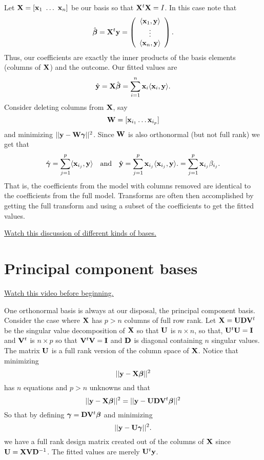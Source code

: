 Let $\mathbf{X} = [\mathbf{x}_1 ~ \ldots ~ \mathbf{x}_n]$ be our basis so that 
$\mathbf{X}^t \mathbf{X} = I$. In this case note that 
$$
\hat {\boldsymbol{\beta}}
= \mathbf{X}^t \mathbf{y} 
= 
\left(
\begin{array}{c}
 \langle \mathbf{x}_1, \mathbf{y} \rangle \\
 \vdots \\
 \langle \mathbf{x}_n, \mathbf{y} \rangle
\end{array}
\right).
$$
Thus, our coefficients are exactly the inner products of the basis elements (columns of $\mathbf{X}$) and the outcome. Our fitted values are
$$
\hat {\mathbf{y}} = \mathbf{X} \hat {\boldsymbol{\beta}} = \sum_{i=1}^n \mathbf{x}_i \langle \mathbf{x}_i, \mathbf{y} \rangle.
$$
Consider deleting columns from $\mathbf{X}$, say 
$$
\mathbf{W} = [\mathbf{x}_{i_1} \ldots \mathbf{x}_{i_p}]
$$
and minimizing $||\mathbf{y} - \mathbf{W} \boldsymbol{\gamma}||^2$. Since $\mathbf{W}$ is also orthonormal (but not full rank) we get that 
$$
\hat {\boldsymbol{\gamma}} = \sum_{j=1}^p \langle \mathbf{x}_{i_j}, \mathbf{y} \rangle ~~~
\mbox{and} ~~~
\hat {\mathbf{y}} = \sum_{j=1}^p \mathbf{x}_{i_j} \langle \mathbf{x}_{i_j}, \mathbf{y} \rangle.
=  \sum_{j=1}^p \mathbf{x}_{i_j} \beta_{i_j}.
$$
That is, the coefficients from the model with columns removed are identical
to the coefficients from the full model. Transforms are often then
accomplished by getting the full transform and using a subset of the 
coefficients to get the fitted values. 

\href{https://www.youtube.com/watch?v=E-GvgGkYSoQ&list=PLpl-gQkQivXhdgUCdaUQcdb31CRe8Mm2y&index=33}{Watch this discussion of different kinds of bases.}


\section{Principal component bases}

\href{https://www.youtube.com/watch?v=mVrm4CxQ1Xs&list=PLpl-gQkQivXhdgUCdaUQcdb31CRe8Mm2y&index=34}{Watch this video before beginning.}

One orthonormal basis is always at our disposal, the principal component basis. 
Consider the case where $\mathbf{X}$ has $p > n$ columns of full row rank.
Let $\mathbf{X} = \mathbf{U} \mathbf{D} \mathbf{V}^t$ be the singular value decomposition of $\mathbf{X}$ so
that $\mathbf{U}$ is $n \times n$, so that, $\mathbf{U}^t \mathbf{U} = \mathbf{I}$ and $\mathbf{V}^t$
is $n\times p$ so that $\mathbf{V}^t \mathbf{V} = \mathbf{I}$ and $\mathbf{D}$ is diagonal containing
$n$ singular values. The matrix $\mathbf{U}$ is a full rank version of the
column space of $\mathbf{X}$. Notice that minimizing
$$
||\mathbf{y} - \mathbf{X} \boldsymbol{\beta}||^2
$$
has $n$ equations and $p>n$ unknowns and that
$$
||\mathbf{y} - \mathbf{X} \boldsymbol{\beta}||^2
= 
||\mathbf{y} -  \mathbf{U} \mathbf{D} \mathbf{V}^t \boldsymbol{\beta}||^2
$$
So that by defining $\boldsymbol{\gamma} = \mathbf{D} \mathbf{V}^t \boldsymbol{\beta}$ and minimizing 
$$
||\mathbf{y} -  \mathbf{U} \boldsymbol{\gamma}||^2.
$$
we have a full rank design matrix created out of the columns of $\mathbf{X}$ since
$\mathbf{U} = \mathbf{X} \mathbf{V} \mathbf{D}^{-1}$. 
The fitted values are merely $\mathbf{U}^t \mathbf{y}$.


